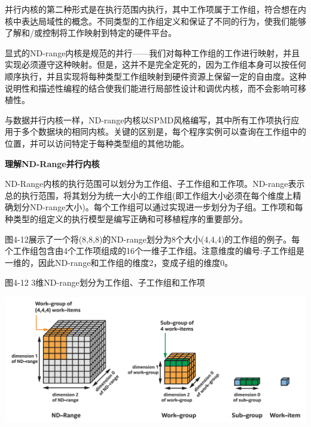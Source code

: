 并行内核的第二种形式是在执行范围内执行，其中工作项属于工作组，符合想在内核中表达局域性的概念。不同类型的工作组定义和保证了不同的行为，使我们能够了解和/或控制将工作映射到特定的硬件平台。\par

显式的ND-range内核是规范的并行——我们对每种工作组的工作进行映射，并且实现必须遵守这种映射。但是，这并不是完全定死的，因为工作组本身可以按任何顺序执行，并且实现将每种类型工作组映射到硬件资源上保留一定的自由度。这种说明性和描述性编程的结合使我们能进行局部性设计和调优内核，而不会影响可移植性。\par

与数据并行内核一样，ND-range内核以SPMD风格编写，其中所有工作项执行应用于多个数据块的相同内核。关键的区别是，每个程序实例可以查询在工作组中的位置，并可以访问特定于每种类型组的其他功能。\par

\hspace*{\fill} \par %
\textbf{理解ND-Range并行内核}

ND-Range内核的执行范围可以划分为工作组、子工作组和工作项。ND-range表示总的执行范围，将其划分为统一大小的工作组(即工作组大小必须在每个维度上精确划分ND-range大小)。每个工作组可以通过实现进一步划分为子组。工作项和每种类型的组定义的执行模型是编写正确和可移植程序的重要部分。\par

图4-12展示了一个将(8,8,8)的ND-range划分为8个大小(4,4,4)的工作组的例子。每个工作组包含由4个工作项组成的16个一维子工作组。注意维度的编号:子工作组是一维的，因此ND-range和工作组的维度2，变成子组的维度0。\par

\hspace*{\fill} \par %
图4-12 3维ND-range划分为工作组、子工作组和工作项
\begin{center}
	\includegraphics[width=1.\textwidth]{content/chapter-4/images/5}
\end{center}


